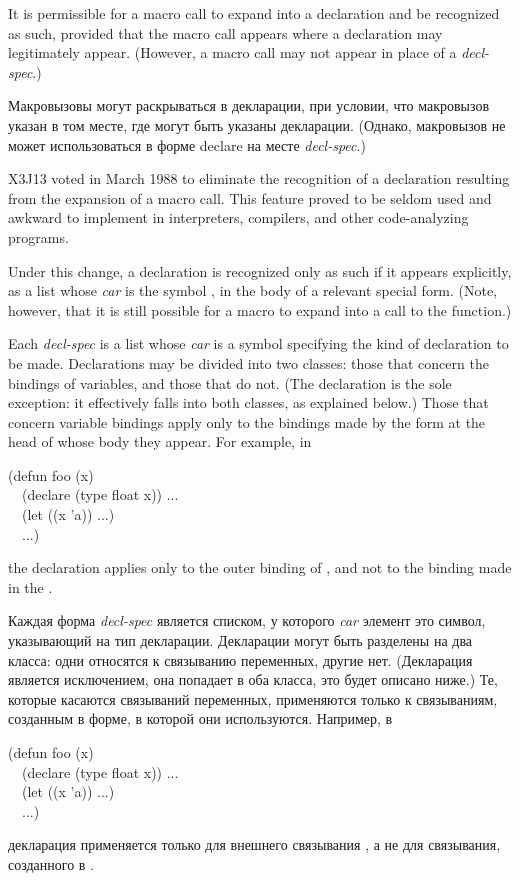 \begin{defspec}
It is permissible for a macro call to expand into a declaration
and be recognized as such, provided that the macro call
appears where a declaration may legitimately appear.
(However, a macro call may not appear in place of a \emph{decl-spec}.)

Макровызовы могут раскрываться в декларации, при условии, что макровызов указан
в том месте, где могут быть указаны декларации.
(Однако, макровызов не может использоваться в форме declare на месте \emph{decl-spec}.)

\begin{new}
X3J13 voted in March 1988
to eliminate the recognition of
a declaration resulting from the expansion of a macro call.
This feature proved to be seldom used and
awkward to implement in interpreters, compilers, and other code-analyzing programs.

Under this change, a declaration is recognized only as such if
it appears explicitly, as a list whose \emph{car} is the symbol ,
in the body of a relevant special form.  (Note, however, that it
is still possible for a macro to expand into a call to the 
function.)
\end{new}

Each \emph{decl-spec} is a list whose \emph{car} is a symbol
specifying the kind of declaration to be made.  Declarations may be
divided into two classes: those that concern the bindings of variables,
and those that do not. (The  declaration is the sole
exception: it effectively falls into both classes, as explained below.)
Those that concern variable bindings apply
only to the bindings made by the form at the head of whose body they
appear.  For example, in
\begin{lisp}
(defun foo (x) \\
~~(declare (type float x)) ... \\
~~(let ((x 'a)) ...) \\
~~...)
\end{lisp}
the  declaration applies only to the outer binding of ,
and not to the binding made in the .

Каждая форма \emph{decl-spec} является списком, у которого \emph{car} элемент
это символ, указывающий на тип декларации. Декларации могут быть разделены на
два класса: одни относятся к связыванию переменных, другие нет.
(Декларация  является исключением, она попадает в оба класса, это
будет описано ниже.) 
Те, которые касаются связываний переменных, применяются только к связываниям,
созданным в форме, в которой они используются. Например, в 
\begin{lisp}
(defun foo (x) \\
~~(declare (type float x)) ... \\
~~(let ((x 'a)) ...) \\
~~...)
\end{lisp}
декларация  применяется только для внешнего связывания , а не
для связывания, созданного в .


\end{defspec}

